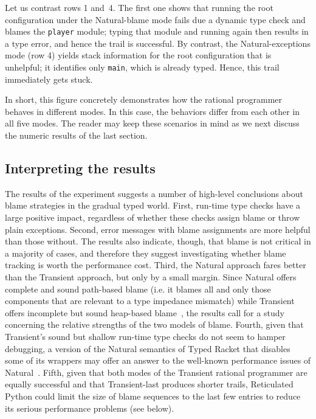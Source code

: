 Let us contrast rows 1 and~4. The first one shows that running the root
configuration under the Natural-blame mode fails due a dynamic type check and
blames the {\tt player} module; typing that module and running again then
results in a type error, and hence the trail is successful.  By contrast, the
Natural-exceptions mode (row 4) yields stack information for the root
configuration that is unhelpful; it identifies only {\tt main}, which is already
typed. Hence, this trail immediately gets stuck.

In short, this figure concretely demonstrates how the rational programmer
behaves in different modes. In this case, the behaviors differ from each other
in all five modes. The reader may keep these scenarios in mind as we next
discuss the numeric results of the last section.

\subsection{Interpreting the results}

The results of the experiment suggests a number of high-level conclusions about
blame strategies in the gradual typed world.  First, run-time type checks have a
large positive impact, regardless of whether these checks assign blame or throw
plain exceptions.  Second, error messages with blame assignments are more
helpful than those without. The results also indicate, though, that blame is not
critical in a majority of cases, and therefore they suggest investigating
whether blame tracking is worth the performance cost.  Third, the Natural
approach fares better than the Transient approach, but only by a small margin.
Since Natural offers complete and sound path-based blame (i.e. it blames all and only those components
that are relevant to a type impedance mismatch) while Transient offers
incomplete but sound heap-based blame~\citep{gfd-oopsla-2019}, the results call
for a study concerning the relative strengths of the two models of blame.
Fourth, given that Transient's sound but shallow run-time type checks do not
seem to hamper debugging, a version of the Natural semantics of Typed Racket
that disables some of its wrappers may offer an answer to the well-known
performance issues of Natural~\citep{gtnffvf-jfp-2019}.  Fifth, given that both
modes of the Transient rational programmer are equally successful and that
Transient-last produces shorter trails, Reticulated Python could limit the size
of blame sequences to the last few entries to reduce its serious performance
problems (see below).

